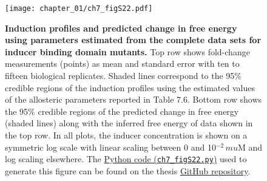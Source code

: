 \documentclass[12pt]{caltech_thesis}
\begin{document}
\hypertarget{fig:global_IND_profiles}{%
\begin{figure}
\centering
\texttt{[image: chapter\_01/ch7\_figS22.pdf]}
\caption[{Induction profiles and predicted change in free energy using
parameters estimated from the complete data sets for inducer binding
domain mutants.}]{\textbf{Induction profiles and predicted change in
free energy using parameters estimated from the complete data sets for
inducer binding domain mutants.} Top row shows fold-change measurements
(points) as mean and standard error with ten to fifteen biological
replicates. Shaded lines correspond to the 95\% credible regions of the
induction profiles using the estimated values of the allosteric
parameters reported in Table 7.6. Bottom row shows the 95\% credible
regions of the predicted change in free energy (shaded lines) along with
the inferred free energy of data shown in the top row. In all plots, the
inducer concentration is shown on a symmetric log scale with linear
scaling between 0 and 10\(^{-2}\, mu\)M and log scaling elsewhere. The
\href{https://github.com/gchure/phd/blob/master/src/chapter_07/code/ch7_figS22.py}{Python
code (\texttt{ch7\_figS22.py})} used to generate this figure can be
found on the thesis \href{https://github.com/gchure/phd}{GitHub
repository}.}
\label{fig:global_IND_profiles}
\end{figure}
}
\end{document}
